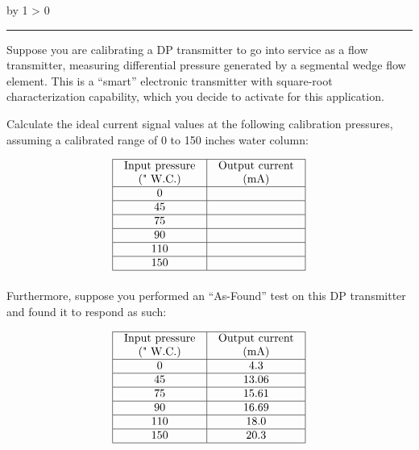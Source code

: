\documentclass[12pt,a4paper]{article}
\def\oppgave{
            \advance\questnum by 1
            \ifnum \questnum > 0
                 \hrule
                 \vskip 3pt
                 \leftline{Oppgave \the\questnum}
                 \vskip 3pt \fi}
\begin{document}

\vfil \eject 


\oppgave{} 

Suppose you are calibrating a DP transmitter to go into service as a flow transmitter, measuring differential pressure generated by a segmental wedge flow element.  This is a ``smart'' electronic transmitter with square-root characterization capability, which you decide to activate for this application.

Calculate the ideal current signal values at the following calibration pressures, assuming a calibrated range of 0 to 150 inches water column:


$$\vbox{\offinterlineskip
\halign{\strut
\vrule \quad\hfil # \ \hfil & 
\vrule \quad\hfil # \ \hfil \vrule \cr
\noalign{\hrule}
%
Input pressure & Output current \cr
(" W.C.) & (mA) \cr
%
\noalign{\hrule}
%
0 &  \cr
%
\noalign{\hrule}
%
45 &  \cr
%
\noalign{\hrule}
%
75 &  \cr
%
\noalign{\hrule}
%
90 &  \cr
%
\noalign{\hrule}
%
110 &  \cr
%
\noalign{\hrule}
%
150 &  \cr
%
\noalign{\hrule}
} %
}$$ %

Furthermore, suppose you performed an ``As-Found'' test on this DP transmitter and found it to respond as such:


$$\vbox{\offinterlineskip
\halign{\strut
\vrule \quad\hfil # \ \hfil & 
\vrule \quad\hfil # \ \hfil \vrule \cr
\noalign{\hrule}
%
Input pressure & Output current \cr
(" W.C.) & (mA) \cr
%
\noalign{\hrule}
%
0 & 4.3 \cr
%
\noalign{\hrule}
%
45 & 13.06 \cr
%
\noalign{\hrule}
%
75 & 15.61 \cr
%
\noalign{\hrule}
%
90 & 16.69 \cr
%
\noalign{\hrule}
%
110 & 18.0 \cr
%
\noalign{\hrule}
%
150 & 20.3 \cr
%
\noalign{\hrule}
} %
}$$ %
\end{document}
